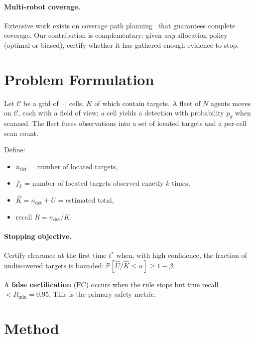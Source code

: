 \documentclass[11pt]{article}
\newcommand{\FC}{\mathrm{FC}}
\newcommand{\Uhat}{\hat{U}}
\newcommand{\Khat}{\hat{K}}
\newcommand{\Rcal}{R_{\min}}
\begin{document}
\paragraph{Multi-robot coverage.}
Extensive work exists on coverage path planning~\cite{choset2001} that guarantees complete
coverage. Our contribution is complementary: given \emph{any} allocation policy (optimal or
biased), certify whether it has gathered enough evidence to stop.

\section{Problem Formulation}
\label{sec:problem}

Let $\mathcal{C}$ be a grid of $|{\cdot}|$ cells, $K$ of which contain targets. A fleet of $N$
agents moves on $\mathcal{C}$, each with a field of view; a cell yields a detection with
probability $p_d$ when scanned. The fleet fuses observations into a set of located targets and a
per-cell scan count.

Define:
\begin{itemize}
\item $n_{\mathrm{det}}$ = number of located targets,
\item $f_k$ = number of located targets observed exactly $k$ times,
\item $\Khat = n_{\mathrm{det}} + U$ = estimated total,
\item recall $R = n_{\mathrm{det}}/K$.
\end{itemize}

\paragraph{Stopping objective.}
Certify clearance at the first time $t^*$ when, with high confidence, the fraction of undiscovered
targets is bounded: $\mathbb{P}[\Uhat/\Khat \le \alpha] \ge 1-\beta$.

A \textbf{false certification} ($\FC$) occurs when the rule stops but true recall
$< \Rcal = 0.95$. This is the primary safety metric.

\section{Method}
\label{sec:method}
\end{document}
